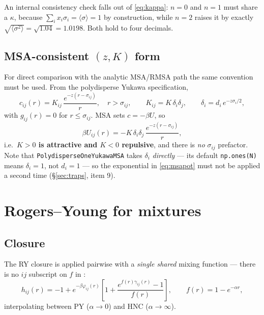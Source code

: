 \documentclass[11pt,a4paper]{article}
\newcommand{\code}[1]{\texttt{\hspace{0pt}#1}}
\begin{document}
An internal consistency check falls out of \eqref{eq:kappa}: $n=0$ and $n=1$
must share a $\kappa$, because $\sum_i x_i\sigma_i=\langle\sigma\rangle=1$ by
construction, while $n=2$ raises it by exactly
$\sqrt{\langle\sigma^2\rangle}=\sqrt{1.04}=1.0198$. Both hold to four
decimals.

\subsection{MSA-consistent \texorpdfstring{$(z,K)$}{(z,K)} form}
\label{sec:zk}

For direct comparison with the analytic MSA/RMSA path the same convention
must be used. From the polydisperse Yukawa specification,
\begin{equation}
c_{ij}(r) = K_{ij}\,\frac{e^{-z(r-\sigma_{ij})}}{r},\quad r>\sigma_{ij},
\qquad K_{ij}=K\,\delta_i\delta_j,
\qquad \delta_i = d_i\,e^{-z\sigma_i/2},
\label{eq:msapot}
\end{equation}
with $g_{ij}(r)=0$ for $r\le\sigma_{ij}$. MSA sets $c=-\beta U$, so
\begin{equation}
\beta U_{ij}(r) = -K\,\delta_i\delta_j\,\frac{e^{-z(r-\sigma_{ij})}}{r},
\end{equation}
i.e.\ \textbf{$K>0$ is attractive and $K<0$ repulsive}, and there is
\emph{no} $\sigma_{ij}$ prefactor. Note that
\code{PolydisperseOneYukawaMSA} takes $\delta_i$ \emph{directly} --- its
default \code{np.ones(N)} means $\delta_i=1$, not $d_i=1$ --- so the
exponential in \eqref{eq:msapot} must not be applied a second time
(\S\ref{sec:traps}, item 9).

\section{Rogers--Young for mixtures}

\subsection{Closure}

The RY closure is applied pairwise with a \emph{single shared} mixing
function --- there is no $ij$ subscript on $f$ in \cite{DAguannoKlein1991}:
\begin{equation}
h_{ij}(r) = -1 + e^{-\beta\varphi_{ij}(r)}
  \left[1+\frac{e^{f(r)\gamma_{ij}(r)}-1}{f(r)}\right],
\qquad
f(r) = 1-e^{-\alpha r},
\label{eq:ry}
\end{equation}
interpolating between PY ($\alpha\to0$) and HNC ($\alpha\to\infty$).
\end{document}

